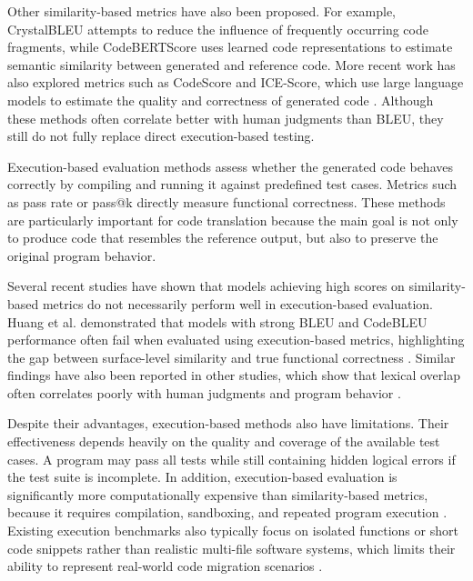 Other similarity-based metrics have also been proposed. For example,
CrystalBLEU %
attempts to reduce the influence of frequently occurring code fragments, while
CodeBERTScore uses learned code representations to estimate semantic similarity
between generated and reference code. More recent work has also explored metrics
such as CodeScore and ICE-Score, which use large language models to estimate the
quality and correctness of generated code \cite{codescore2023, ice_score}.
Although these methods often correlate better with human judgments than BLEU,
they still do not fully replace direct execution-based testing.

Execution-based evaluation methods assess whether the generated code behaves
correctly by compiling and running it against predefined test cases. Metrics
such as pass rate or pass@k directly measure functional correctness. These
methods are particularly important for code translation because the main goal is
not only to produce code that resembles the reference output, but also to
preserve the original program behavior.

Several recent studies have shown that models achieving high scores on
similarity-based metrics do not necessarily perform well in execution-based
evaluation. Huang et al. demonstrated that models with strong BLEU and
CodeBLEU performance often fail when evaluated using execution-based metrics,
highlighting the gap between surface-level similarity and true functional
correctness \cite{huang2022exeds}. Similar findings have also been reported in
other studies, which show that lexical overlap often correlates poorly with
human judgments and program behavior \cite{evtikhiev2022bleu,
tran2019ruby}.

Despite their advantages, execution-based methods also have limitations. Their
effectiveness depends heavily on the quality and coverage of the available test
cases. A program may pass all tests while still containing hidden logical errors
if the test suite is incomplete. In addition, execution-based evaluation is
significantly more computationally expensive than similarity-based metrics,
because it requires compilation, sandboxing, and repeated program execution
\cite{huang2022exeds}. Existing execution benchmarks also typically focus on
isolated functions or short code snippets rather than realistic multi-file
software systems, which limits their ability to represent real-world code
migration scenarios \cite{evaluation_limitations, llm_limitations}.

